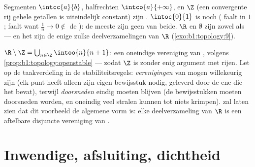\begin{example}\label{ex:b1:topology:closed}
Segmenten $\intcc{a}{b}$, halfrechten $\intco{a}{+\infty}$,  en $\Z$ (een convergente rij gehele getallen is
uiteindelijk constant) zijn . $\intoc{0}{1}$ is  noch
 ( faalt in $1$;  faalt want $\frac 1n \to 0 \notin$
de ): de meeste  zijn geen van beide. $\R$ en
$\emptyset$ zijn zowel  als  --- en het zijn de enige zulke
deelverzamelingen van $\R$ (\cref{exo:b1:topology:9}).
\end{example}

\begin{example}\label{ex:b1:topology:rminusz}
$\R \setminus \Z = \bigcup_{n \in \Z} \intoo{n}{n+1}$: een oneindige
vereniging van  ,  volgens
\cref{prop:b1:topology:openstable} --- zodat $\Z$  is zonder enig
argument met rijen. Let op de taakverdeling in de stabiliteitsregels:
\emph{verenigingen} van  mogen willekeurig zijn (elk
punt heeft alleen zijn eigen bewijsstuk nodig, geleverd door de ene
 die het bevat), terwijl \emph{doorsneden} eindig moeten
blijven (de bewijsstukken moeten doorsneden worden, en oneindig veel
stralen kunnen tot niets krimpen).  zal laten
zien dat dit voorbeeld de algemene vorm is: elke  deelverzameling van
$\R$ is een aftelbare disjuncte vereniging van  .
\end{example}

\section{Inwendige, afsluiting, dichtheid}

